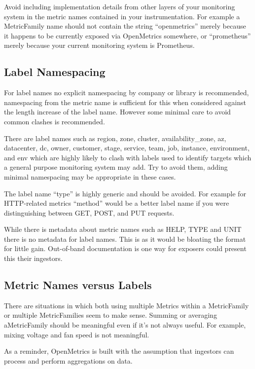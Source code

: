 \documentclass[a4paper,12pt,notitlepage,twoside,openright]{article}
\begin{document}
Avoid including implementation details from other layers of your
monitoring system in the metric names contained in your instrumentation.
For example a MetricFamily name should not contain the string
``openmetrics'' merely because it happens to be currently exposed via
OpenMetrics somewhere, or ``prometheus'' merely because your current
monitoring system is Prometheus.

\hypertarget{label-namespacing}{%
\subsection{Label Namespacing}\label{label-namespacing}}

For label names no explicit namespacing by company or library is
recommended, namespacing from the metric name is sufficient for this
when considered against the length increase of the label name. However
some minimal care to avoid common clashes is recommended.

There are label names such as region, zone, cluster, availability\_zone,
az, datacenter, dc, owner, customer, stage, service, team, job,
instance, environment, and env which are highly likely to clash with
labels used to identify targets which a general purpose monitoring
system may add. Try to avoid them, adding minimal namespacing may be
appropriate in these cases.

The label name ``type'' is highly generic and should be avoided. For
example for HTTP-related metrics ``method'' would be a better label name
if you were distinguishing between GET, POST, and PUT requests.

While there is metadata about metric names such as HELP, TYPE and UNIT
there is no metadata for label names. This is as it would be bloating
the format for little gain. Out-of-band documentation is one way for
exposers could present this their ingestors.

\hypertarget{metric-names-versus-labels}{%
\subsection{Metric Names versus
Labels}\label{metric-names-versus-labels}}

There are situations in which both using multiple Metrics within a
MetricFamily or multiple MetricFamilies seem to make sense. Summing or
averaging aMetricFamily should be meaningful even if it's not always
useful. For example, mixing voltage and fan speed is not meaningful.

As a reminder, OpenMetrics is built with the assumption that ingestors
can process and perform aggregations on data.
\end{document}
